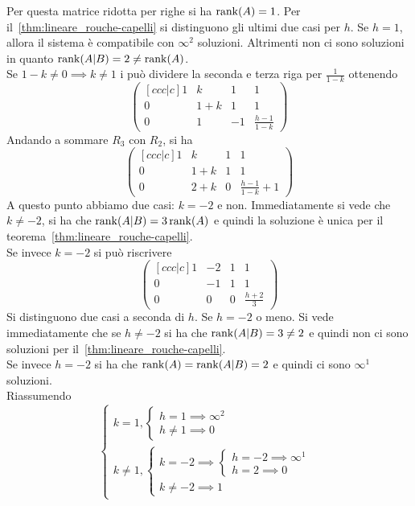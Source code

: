 Per questa matrice ridotta per righe si ha $\rank(A)=1$. Per
il~\autoref{thm:lineare_rouche-capelli} si distinguono gli ultimi due casi per $h$. Se
$h=1$, allora il sistema è compatibile con $\infty^2$ soluzioni. Altrimenti non ci sono
soluzioni in quanto $\rank(A\vert B) = 2 \neq \rank(A)$.\\
Se $1-k\neq0\implies k\neq1$ i può dividere la seconda e terza riga per $\frac{1}{1-k}$
ottenendo
\begin{equation*}
    \begin{pmatrix}[ccc|c]
    1 & k & 1 & 1\\
    0 & 1+k & 1 & 1\\
    0 & 1 & -1 & \frac{h-1}{1-k}
    \end{pmatrix}
\end{equation*}
Andando a sommare $R_3$ con $R_2$, si ha
\begin{equation*}
    \begin{pmatrix}[ccc|c]
    1 & k & 1 & 1\\
    0 & 1+k & 1 & 1\\
    0 & 2+k & 0 & \frac{h-1}{1-k}+1
    \end{pmatrix}
\end{equation*}
A questo punto abbiamo due casi: $k=-2$ e non. Immediatamente si vede che $k\neq-2$, si
ha che $\rank(A\vert B) = 3 \rank(A)$ e quindi la soluzione è unica per il
teorema~\autoref{thm:lineare_rouche-capelli}.\\
Se invece $k=-2$ si può riscrivere
\begin{equation*}
    \begin{pmatrix}[ccc|c]
      1 & -2 & 1 & 1\\
      0 & -1 & 1 & 1\\
      0 & 0 & 0 & \frac{h+2}{3}
    \end{pmatrix}
\end{equation*}
Si distinguono due casi a seconda di $h$. Se $h=-2$ o meno. Si vede immediatamente che
se $h\neq-2$ si ha che $\rank(A\vert B)=3\neq2$ e quindi non ci sono soluzioni per
il~\autoref{thm:lineare_rouche-capelli}.\\
Se invece $h=-2$ si ha che $\rank(A) = \rank(A\vert B) = 2$ e quindi ci sono $\infty^1$
soluzioni.\\
Riassumendo
\begin{equation*}
  \begin{cases}
    k=1,
    \begin{cases}
      h=1\implies\infty^2\\
      h\neq 1\implies 0
    \end{cases}\\
    k\neq1,
    \begin{cases}
      k=-2\implies
      \begin{cases}
        h=-2\implies\infty^1\\
        h=2\implies 0
      \end{cases}\\
      k\neq-2\implies 1
    \end{cases}
  \end{cases}
\end{equation*}
